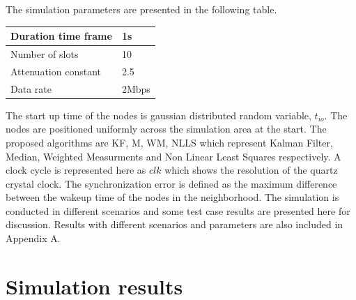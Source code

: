 \documentclass[a4paper,10pt]{report}
\begin{document}
The simulation parameters are presented in the following table.
\begin{center}
    \begin{tabular}{ | l | l |}
    \hline
    Duration time frame & 1s \\ \hline
    Number of slots &  10 \\ \hline
    Attenuation constant & 2.5 \\ \hline
    Data rate &  2Mbps \\ \hline
    \end{tabular}
\end{center}
The start up time of the nodes is gaussian distributed random variable, $t_{io}$. The nodes are positioned uniformly across the simulation area at the start. The proposed algorithms are KF, M, WM, NLLS which represent Kalman Filter, Median, Weighted Measurments and Non Linear Least Squares respectively. A clock cycle is represented here as $clk$ which shows the resolution of the quartz crystal clock. The synchronization error is defined as the maximum difference between the wakeup time of the nodes in the neighborhood. The simulation is conducted in different scenarios and some test case results are presented here for discussion. Results with different scenarios and parameters are also included in Appendix A.
\section{\textbf{Simulation results}}
\end{document}
